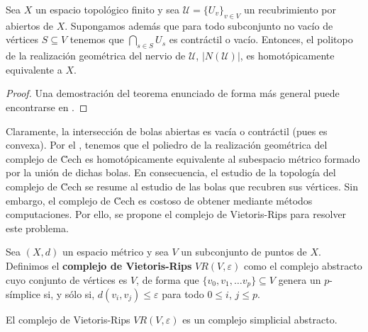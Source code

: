 \begin{teorema} \label{teo:nerve}
	Sea \(X\) un espacio topológico finito y sea \(\mathcal{U} = \{U_v\}_{v \in V}\) un recubrimiento por abiertos de \(X\). Supongamos además que para todo subconjunto no vacío de vértices \(S \subseteq V\) tenemos que \(\bigcap_{s \in S} U_s\) es contráctil o vacío. Entonces, el politopo de la realización geométrica del nervio de $\mathcal{U}$, \(|N(\mathcal{U})|\), es homotópicamente equivalente a \(X\).
\end{teorema}
\begin{proof}
	Una demostración del teorema enunciado de forma más general puede encontrarse en \cite{hatcher2002algebraic}.
\end{proof}

Claramente, la intersección de bolas abiertas es vacía o contráctil (pues es convexa). Por el , tenemos que el poliedro de la realización geométrica del complejo de \u Cech es homotópicamente equivalente al subespacio métrico formado por la unión de dichas bolas. En consecuencia, el estudio de la topología del complejo de \u Cech se resume al estudio de las bolas que recubren sus vértices.
Sin embargo, el complejo de \u Cech es costoso de obtener mediante métodos computaciones. Por ello, se propone el complejo de Vietoris-Rips para resolver este problema.

\begin{definicion}
	Sea \((X,d)\) un espacio métrico y sea \(V\) un subconjunto de puntos de \(X\). Definimos el \textbf{complejo de Vietoris-Rips} \(VR(V,\varepsilon)\) como el complejo abstracto cuyo conjunto de vértices es \(V\), de forma que \(\{v_0, v_1, \dots v_p\} \subseteq V\) genera un \(p\)-símplice si, y sólo si, \(d(v_i,v_j) \leq \varepsilon\) para todo \(0 \leq i\), \(j \leq p\).
\end{definicion}

\begin{proposicion}
	El complejo de Vietoris-Rips \(VR(V,\varepsilon)\) es un complejo simplicial abstracto.
\end{proposicion}

